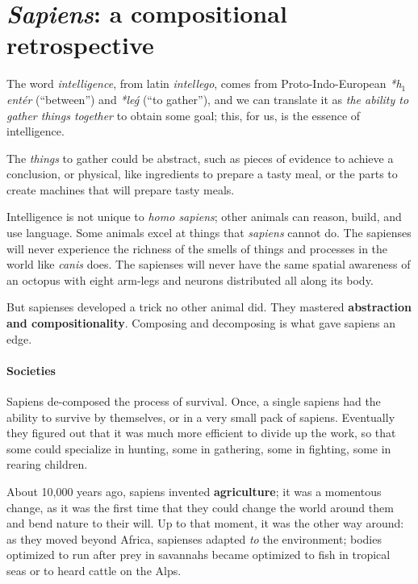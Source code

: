 
\section[Sapiens: a retrospective]{
  \emph{Sapiens}: a compositional retrospective
 }

\label{sec:brief-history}

The word \emph{intelligence}, from latin \emph{intellego}, comes from Proto-Indo-European  \emph{*h${}_1$entér} (``between'') and \emph{*leǵ} (``to gather''), and we can translate it as \emph{the ability to gather things together} to obtain some goal;
this, for us, is the essence of intelligence.

The \emph{things} to gather could be abstract, such as pieces of evidence to achieve a conclusion, or physical, like ingredients to prepare a tasty meal, or the parts to create machines that will prepare tasty meals.

Intelligence is not unique to \emph{homo sapiens}; other animals can reason, build, and use language.
Some animals excel at things that \emph{sapiens} cannot do.
The sapienses will never experience the richness of the smells of things and processes in the world like \emph{canis} does.
The sapienses will never have the same spatial awareness of an octopus with eight arm-legs and neurons distributed all along its body.

But sapienses developed a trick no other animal did.
They mastered \textbf{abstraction and compositionality}.
Composing and decomposing is what gave sapiens an edge.

\paragraph{Societies}

Sapiens de-composed the process of survival.
Once, a single sapiens had the ability to survive by themselves, or in a very small pack of sapiens.
Eventually they figured out that it was much more efficient to divide up the work, so that some could specialize in hunting, some in gathering, some in fighting, some in rearing children.

About 10,000 years ago, sapiens invented \textbf{agriculture}; it was a momentous change, as it was the first time that they could change the world around them and bend nature to their will.
Up to that moment, it was the other way around: as they moved beyond Africa, sapienses adapted \emph{to} the environment;
bodies optimized to run after prey in savannahs became optimized to fish in tropical seas or to heard cattle on the Alps.

